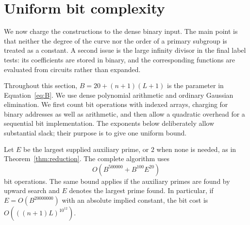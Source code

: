 \section{Uniform bit complexity}
\label{sec:complexity}

We now charge the constructions to the dense binary input.  The main point
is that neither the degree of the curve nor the order of a primary subgroup
is treated as a constant.  A second issue is the large infinity divisor in
the final label tests: its coefficients are stored in binary, and the
corresponding functions are evaluated from circuits rather than expanded.

Throughout this section, $B=20+(n+1)(L+1)$ is the parameter in
Equation~\eqref{eq:B}.  We use dense polynomial arithmetic and ordinary
Gaussian elimination.  We first count bit operations with indexed arrays,
charging for binary addresses as well as arithmetic, and then allow a
quadratic overhead for a sequential bit implementation.  The exponents
below deliberately allow substantial slack; their purpose is to give one
uniform bound.

\begin{samepage}
\begin{proposition}\label{complexity:bound}
Let $E$ be the largest supplied auxiliary prime, or $2$ when none is needed,
as in Theorem~\ref{thm:reduction}.  The complete algorithm uses
\begin{equation}
 O\left(B^{500000}+B^{100}E^{20}\right)
 \label{complexity:total}
\end{equation}
bit operations.  The same bound applies if the auxiliary primes are found
by upward search and $E$ denotes the largest prime found.  In particular,
if $E=O(B^{20000000})$ with an absolute implied constant, the bit cost is
$O(((n+1)L)^{10^{12}})$.
\end{proposition}
\end{samepage}

